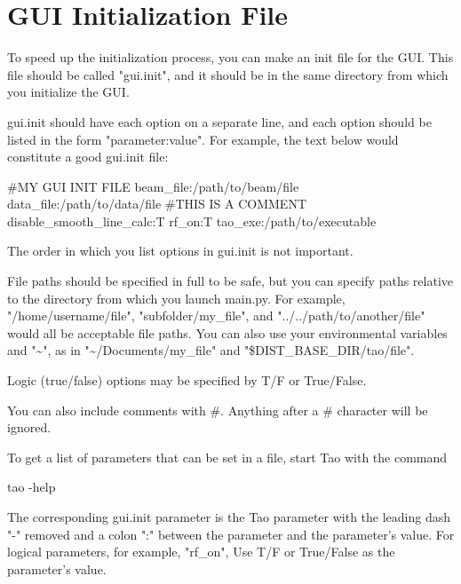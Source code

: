 
\section{GUI Initialization File}
\label{s:gui.init.file}

To speed up the initialization process, you can make an init file for the GUI.  This file should be called "gui.init", and it should be in the same directory from which you initialize the GUI.

gui.init should have each option on a separate line, and each option should be listed in the form "parameter:value".  For example, the text below would constitute a good gui.init file:

\begin{example}
  #MY GUI INIT FILE
  beam_file:/path/to/beam/file
  data_file:/path/to/data/file
  #THIS IS A COMMENT
  disable_smooth_line_calc:T
  rf_on:T
  tao_exe:/path/to/executable
\end{example}

The order in which you list options in gui.init is not important.

File paths should be specified in full to be safe, but you can specify paths relative to the directory from which you launch main.py.  For example, "/home/username/file", "subfolder/my_file", and "../../path/to/another/file" would all be acceptable file paths.  You can also use your environmental variables and "\textasciitilde{}", as in "\textasciitilde{}/Documents/my_file" and "\$DIST_BASE_DIR/tao/file".

Logic (true/false) options may be specified by T/F or True/False.

You can also include comments with \#.  Anything after a \# character will be ignored.

To get a list of parameters that can be set in a  file, start Tao with the command
\begin{example}
  tao -help
\end{example}
The corresponding gui.init parameter is the Tao parameter with the leading dash "-" removed and a
colon ":" between the parameter and the parameter's value. For logical parameters, for example,
"rf_on", Use T/F or True/False as the parameter's value.

